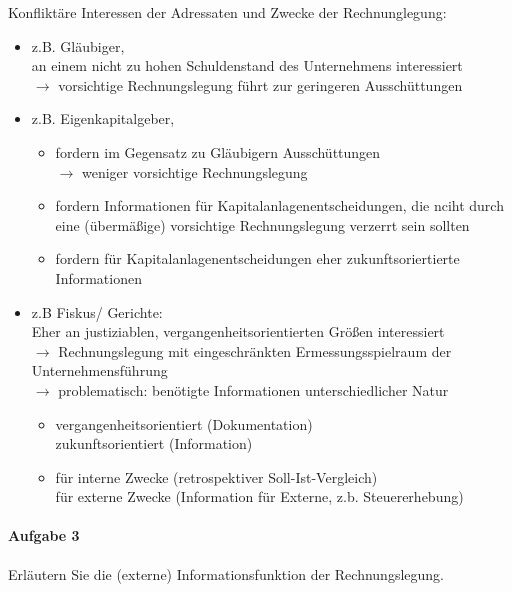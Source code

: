 \documentclass[paper=a4, fontsize=11pt]{scrartcl}
\numberwithin{equation}{section}
\numberwithin{figure}{section}
\numberwithin{table}{section}
\begin{document}
Konfliktäre Interessen der Adressaten und Zwecke der Rechnunglegung: \\
\begin{itemize}
\item z.B. Gläubiger, \\
an einem nicht zu hohen Schuldenstand des Unternehmens interessiert \\
$\rightarrow$ vorsichtige Rechnungslegung führt zur geringeren Ausschüttungen

\item z.B. Eigenkapitalgeber,
  \begin{itemize}
  \item fordern im Gegensatz zu Gläubigern Ausschüttungen \\
$\rightarrow$ weniger vorsichtige Rechnungslegung
  \item fordern Informationen für Kapitalanlagenentscheidungen, die nciht durch eine (übermäßige) vorsichtige Rechnungslegung verzerrt sein sollten
  \item fordern für Kapitalanlagenentscheidungen eher zukunftsoriertierte Informationen
\end{itemize}

\item z.B Fiskus/ Gerichte: \\
Eher an justiziablen, vergangenheitsorientierten Größen interessiert \\
$\rightarrow$ Rechnungslegung mit eingeschränkten Ermessungsspielraum der Unternehmensführung \\
$\rightarrow$ problematisch:  benötigte Informationen unterschiedlicher Natur \\
  \begin{itemize}
  \item vergangenheitsorientiert (Dokumentation) \\
zukunftsorientiert (Information)
  \item für interne Zwecke (retrospektiver Soll-Ist-Vergleich) \\
für externe Zwecke (Information für Externe, z.b. Steuererhebung)
\end{itemize}
\end{itemize}

\paragraph{Aufgabe 3}
Erläutern Sie die (externe) Informationsfunktion der Rechnungslegung. \\
\end{document}
